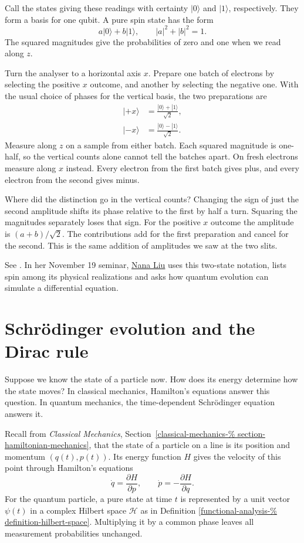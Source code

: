 Call the states giving these readings with
certainty $|0\rangle$ and $|1\rangle$,
respectively. They form a basis for one
qubit. A pure spin state has the form
$$
a|0\rangle+b|1\rangle,
\qquad |a|^2+|b|^2=1.
$$
The squared magnitudes give the probabilities
of zero and one when we read along $z$.

Turn the analyser to a horizontal axis $x$.
Prepare one batch of electrons by selecting
the positive $x$ outcome, and another by
selecting the negative one. With the usual
choice of phases for the vertical basis, the
two preparations are
$$
\begin{aligned}
|{+x}\rangle
&=\frac{|0\rangle+|1\rangle}{\sqrt 2},\\
|{-x}\rangle
&=\frac{|0\rangle-|1\rangle}{\sqrt 2}.
\end{aligned}
$$
Measure along $z$ on a sample from either
batch. Each squared magnitude is one-half, so
the vertical counts alone cannot tell the
batches apart. On fresh electrons measure
along $x$ instead. Every electron from the
first batch gives plus, and every electron
from the second gives minus.

Where did the distinction go in the vertical
counts? Changing the sign of just the second
amplitude shifts its phase relative to the
first by half a turn. Squaring the magnitudes
separately loses that sign. For the positive
$x$ outcome the amplitude is $(a+b)/\sqrt 2$.
The contributions add for the first
preparation and cancel for the second. This
is the same addition of amplitudes we saw at
the two slits.

See \cite[Vol. III, Sections 6-1 and 6-4]
{feynman-lectures}.
In her November 19 seminar,
\href{https://www.heap-project.org/tag/0H2G}
{Nana Liu} uses this two-state notation,
lists spin among its physical realizations
and asks how quantum evolution can simulate
a differential equation.

\section{Schr\"odinger evolution
and the Dirac rule}
\label{section-dirac-rule}

Suppose we know the state of a particle
now. How does its energy determine how
the state moves? In classical mechanics,
Hamilton's equations answer this question.
In quantum mechanics, the time-dependent
Schr\"odinger equation answers it.

Recall from \emph{Classical Mechanics},
Section~\ref{classical-mechanics-%
section-hamiltonian-mechanics}, that the
state of a particle on a line is its
position and momentum $(q(t),p(t))$.
Its energy function $H$ gives the velocity
of this point through Hamilton's equations
$$
\dot q=\frac{\partial H}{\partial p},
\qquad
\dot p=-\frac{\partial H}{\partial q}.
$$
For the quantum particle, a pure state at
time $t$ is represented by a unit vector
$\psi(t)$ in a complex Hilbert space
$\mathcal H$ as in Definition
\ref{functional-analysis-%
definition-hilbert-space}.
Multiplying it by a common phase leaves all
measurement probabilities unchanged.

